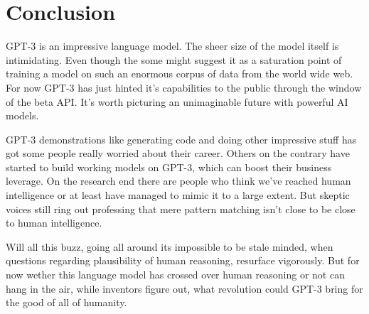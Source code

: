 \chapter*{Conclusion}
\label{chap:conclusion}
\thispagestyle{fancy}
\hspace{0.5cm} GPT-3 is an impressive language model. The sheer size of the model itself is intimidating. Even though the some might suggest it as a saturation point of training a model on such an enormous corpus of data from the world wide web. For now GPT-3 has just hinted it’s capabilities to the public through the window of the beta API. It’s worth picturing an unimaginable future with powerful AI models.

GPT-3 demonstrations like generating code and doing other impressive stuff has got some people really worried about their career. Others on the contrary have started to build working models on GPT-3, which can boost their business leverage. On the research end there are people who think we've reached human intelligence or at least have managed to mimic it to a large extent. But skeptic voices still ring out professing that mere pattern matching isn't close to be close to human intelligence.

Will all this buzz, going all around its impossible to be stale minded, when questions regarding plausibility of human reasoning, resurface vigorously. But for now wether this language model has crossed over human reasoning or not can hang in the air, while inventors figure out, what revolution could GPT-3 bring for the good of all of humanity.
\vspace*{\fill}